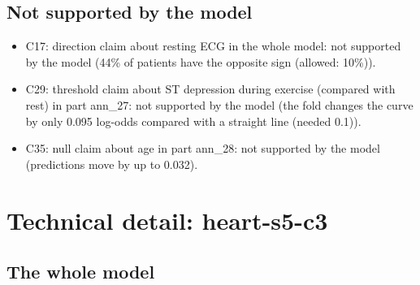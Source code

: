\documentclass[a4paper,10pt]{article}
\newif\ifreviewmarks
\newcommand{\reviewrule}{\noindent{\color{BrickRed}\rule{\linewidth}{0.8pt}}}
\newenvironment{drafted}[1][]{%
  \ifreviewmarks\par\addvspace{\medskipamount}\reviewrule\par\nopagebreak
  \noindent{\color{BrickRed}\sffamily\footnotesize\textbf{Thesis Draft}\quad #1\hfill review}\par\nopagebreak\smallskip\fi}{%
  \ifreviewmarks\par\smallskip\noindent{\color{BrickRed}\sffamily\footnotesize end of thesis draft}\par\nopagebreak\reviewrule\par\medskip\fi}
\begin{document}
\begin{drafted}[plain-language layer: heart-s5-c3]
\subsection{Not supported by the model}
\begin{itemize}\setlength\itemsep{0pt}\small
\item C17: direction claim about resting ECG in the whole model: not supported by the model (44\% of patients have the opposite sign (allowed: 10\%)).
\item C29: threshold claim about ST depression during exercise (compared with rest) in part ann\_\allowbreak{}27: not supported by the model (the fold changes the curve by only 0.095 log-odds compared with a straight line (needed 0.1)).
\item C35: null claim about age in part ann\_\allowbreak{}28: not supported by the model (predictions move by up to 0.032).
\end{itemize}
\clearpage\section*{Technical detail: heart-s5-c3}
\renewcommand{\thesubsection}{T.\arabic{subsection}}\setcounter{subsection}{0}
\subsection{The whole model}\label{tech:ann29}

\end{drafted}
\end{document}
